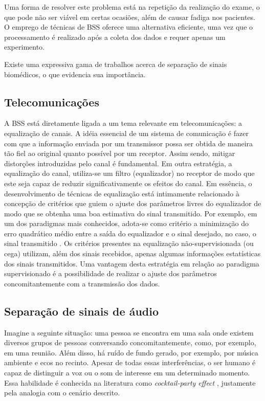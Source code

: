     Uma forma de resolver este problema está na repetição da realização do exame, o que pode não ser viável em certas ocasiões, além de causar fadiga nos pacientes. O emprego de técnicas de BSS oferece uma alternativa eficiente, uma vez que o processamento é realizado após a coleta dos dados e requer apenas um experimento.
    
    Existe uma expressiva gama de trabalhos acerca de separação de sinais biomédicos, o que evidencia sua importância.
    
\subsection{Telecomunicações}

    A BSS está diretamente ligada a um tema relevante em telecomunicações: a equalização de canais. A idéia essencial de um sistema de comunicação é fazer com que a informação enviada por um transmissor possa ser obtida de maneira tão fiel ao original quanto possível por um receptor. Assim sendo, mitigar distorções introduzidas pelo canal é fundamental. Em outra estratégia, a equalização do canal, utiliza-se um filtro (equalizador) no receptor de modo que este seja capaz de reduzir significativamente os efeitos do canal. Em essência, o desenvolvimento de técnicas de equalização está intimamente relacionado à concepção de critérios que guiem o ajuste dos parâmetros livres do equalizador de modo que se obtenha uma boa estimativa do sinal transmitido.
    Por exemplo, em um dos paradigmas mais conhecidos, adota-se como critério a minimização do erro quadrático médio entre a saída do equalizador e o sinal desejado, no caso, o sinal transmitido \cite{Haykin}. Os critérios presentes na equalização não-supervisionada (ou cega) utilizam, além dos sinais recebidos, apenas algumas informações estatísticas dos sinais transmitidos. Uma vantagem desta estratégia em relação ao paradigma supervisionado é a possibilidade de realizar o ajuste dos parâmetros concomitantemente com a transmissão dos dados.
    
\subsection{Separação de sinais de áudio}

    Imagine a seguinte situação: uma pessoa se encontra em uma sala onde existem diversos grupos de pessoas conversando concomitantemente, como, por exemplo, em uma reunião. Além disso, há ruído de fundo gerado, por exemplo, por música ambiente e ecos no recinto. Apesar de todas essas interferências, o ser humano é capaz de distinguir a voz ou o som de interesse em um determinado momento. Essa habilidade é conhecida na literatura como \textit{cocktail-party effect} \cite{cocktail}, justamente pela analogia com o cenário descrito.


